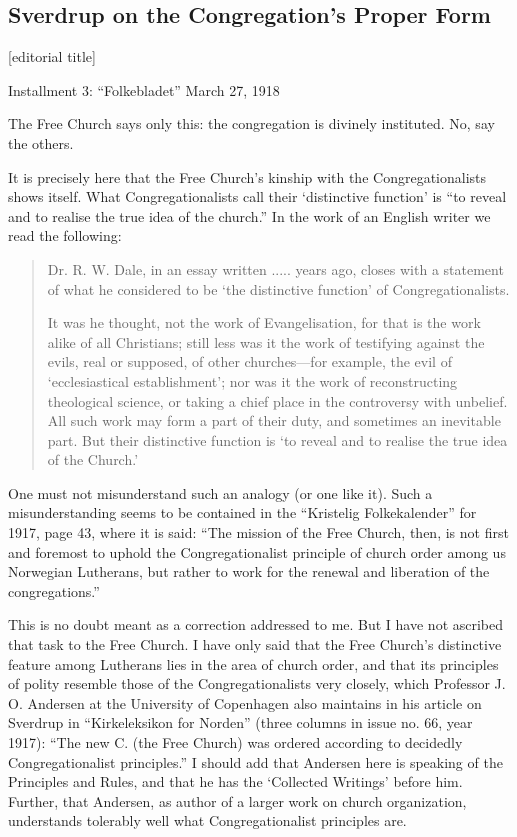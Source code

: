 

\subsection{Sverdrup on the Congregation’s Proper Form}

[editorial title]

Installment 3: “Folkebladet” March 27, 1918


The Free Church says only this: the congregation is divinely instituted. No, say the others.

It is precisely here that the Free Church’s kinship with the Congregationalists shows itself. What Congregationalists call their ‘distinctive function’ is “to reveal and to realise the true idea of the church.” In the work of an English writer we read the following:

\begin{quote}
Dr. R. W. Dale, in an essay written ..... years ago, closes with a statement of what he considered to be ‘the distinctive function’ of Congregationalists.

It was he thought, not the work of Evangelisation, for that is the work alike of all Christians; still less was it the work of testifying against the evils, real or supposed, of other churches—for example, the evil of ‘ecclesiastical establishment’; nor was it the work of reconstructing theological science, or taking a chief place in the controversy with unbelief. All such work may form a part of their duty, and sometimes an inevitable part. But their distinctive function is ‘to reveal and to realise the true idea of the Church.’
\end{quote}

One must not misunderstand such an analogy (or one like it). Such a misunderstanding seems to be contained in the “Kristelig Folkekalender” for 1917, page 43, where it is said: “The mission of the Free Church, then, is not first and foremost to uphold the Congregationalist principle of church order among us Norwegian Lutherans, but rather to work for the renewal and liberation of the congregations.”

This is no doubt meant as a correction addressed to me. But I have not ascribed that task to the Free Church. I have only said that the Free Church’s distinctive feature among Lutherans lies in the area of church order, and that its principles of polity resemble those of the Congregationalists very closely, which Professor J. O. Andersen at the University of Copenhagen also maintains in his article on Sverdrup in “Kirkeleksikon for Norden” (three columns in issue no. 66, year 1917): “The new C. (the Free Church) was ordered according to decidedly Congregationalist principles.” I should add that Andersen here is speaking of the Principles and Rules, and that he has the ‘Collected Writings’ before him. Further, that Andersen, as author of a larger work on church organization, understands tolerably well what Congregationalist principles are.

